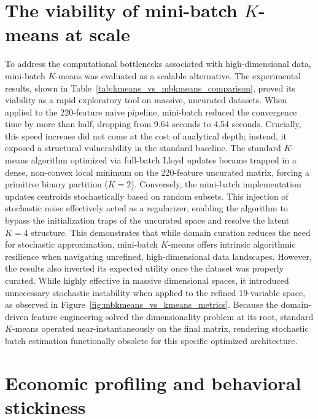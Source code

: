 \section{The viability of mini-batch $K$-means at scale}

To address the computational bottlenecks associated with high-dimensional data, mini-batch $K$-means was evaluated as a scalable alternative.
The experimental results, shown in Table~\ref{tab:kmeans_vs_mbkmeans_comparison}, proved its viability as a rapid exploratory tool on massive, uncurated datasets.
When applied to the 220-feature naive pipeline, mini-batch reduced the convergence time by more than half, dropping from 9.64 seconds to 4.54 seconds.
Crucially, this speed increase did not come at the cost of analytical depth;
instead, it exposed a structural vulnerability in the standard baseline.
The standard $K$-means algorithm optimized via full-batch Lloyd updates became trapped in a dense, non-convex local minimum on the 220-feature uncurated matrix, forcing a primitive binary partition ($K=2$).
Conversely, the mini-batch implementation updates centroids stochastically based on random subsets.
This injection of stochastic noise effectively acted as a regularizer, enabling the algorithm to bypass the initialization traps of the uncurated space and resolve the latent $K=4$ structure.
This demonstrates that while domain curation reduces the need for stochastic approximation, mini-batch $K$-means offers intrinsic algorithmic resilience when navigating unrefined, high-dimensional data landscapes.
However, the results also inverted its expected utility once the dataset was properly curated.
While highly effective in massive dimensional spaces, it introduced unnecessary stochastic instability when applied to the refined 19-variable space, as observed in Figure~\ref{fig:mbkmeans_vs_kmeans_metrics}.
Because the domain-driven feature engineering solved the dimensionality problem at its root, standard $K$-means operated near-instantaneously on the final matrix, rendering stochastic batch estimation functionally obsolete for this specific optimized architecture.

\section{Economic profiling and behavioral stickiness}

